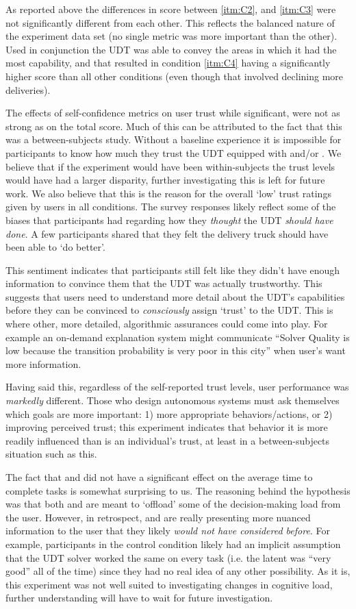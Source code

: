 As reported above the differences in score between \ref{itm:C2}, and \ref{itm:C3} were not significantly different from each other. This reflects the balanced nature of the experiment data set (no single metric was more important than the other). Used in conjunction the UDT was able to convey the areas in which it had the most capability, and that resulted in condition \ref{itm:C4} having a significantly higher score than all other conditions (even though that involved declining more deliveries).

The effects of self-confidence metrics on user trust while significant, were not as strong as on the total score. Much of this can be attributed to the fact that this was a between-subjects study. Without a baseline experience it is impossible for participants to know how much they trust the UDT equipped with \xQ{} and/or \xO. We believe that if the experiment would have been within-subjects the trust levels would have had a larger disparity, further investigating this is left for future work. We also believe that this is the reason for the overall `low' trust ratings given by users in all conditions.  The survey responses likely reflect some of the biases that participants had regarding how they \emph{thought} the UDT \emph{should have done}. A few participants shared that they felt the delivery truck should have been able to `do better'.

This sentiment indicates that participants still felt like they didn't have enough information to convince them that the UDT was actually trustworthy. This suggests that users need to understand more detail about the UDT's capabilities before they can be convinced to \emph{consciously} assign `trust' to the UDT. This is where other, more detailed, algorithmic assurances could come into play. For example an on-demand explanation system might communicate ``Solver Quality is low because the transition probability is very poor in this city'' when user's want more information.

Having said this, regardless of the self-reported trust levels, user performance was \emph{markedly} different. Those who design autonomous systems must ask themselves which goals are more important: 1) more appropriate behaviors/actions, or 2) improving perceived trust; this experiment indicates that behavior it is more readily influenced than is an individual's trust, at least in a between-subjects situation such as this.

The fact that \xQ{} and \xO{} did not have a significant effect on the average time to complete tasks is somewhat surprising to us. The reasoning behind the hypothesis was that both \xQ{} and \xO{} are meant to `offload' some of the decision-making load from the user. However, in retrospect, \xQ{} and \xO{} are really presenting more nuanced information to the user that they likely \emph{would not have considered before}. For example, participants in the control condition likely had an implicit assumption that the UDT solver worked the same on every task (i.e. the latent \xQ{} was ``very good'' all of the time) since they had no real idea of any other possibility. As it is, this experiment was not well suited to investigating changes in cognitive load, further understanding will have to wait for future investigation.

